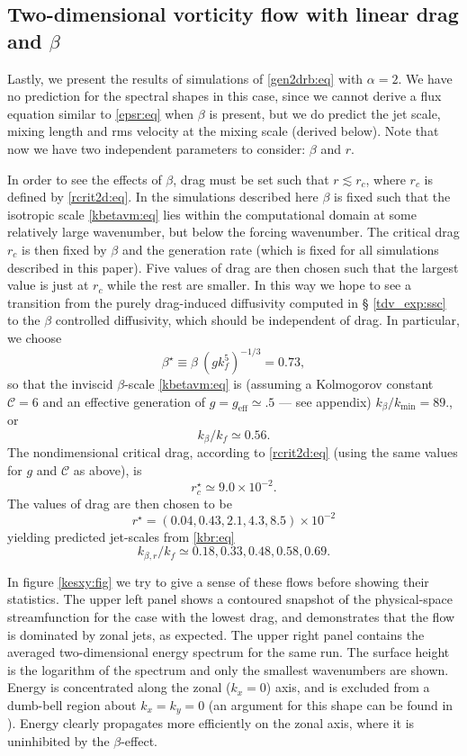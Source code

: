 \documentclass{jfm}
\newcommand{\ca}  [1]{\mathcal{#1}}
\begin{document}
\subsection{Two-dimensional vorticity flow with linear drag and $\beta$}
\label{tdvbr_exp:ssc}

Lastly, we present the results of simulations of \eqref{gen2drb:eq}
with $\alpha=2$.  We have no prediction for the spectral shapes in
this case, since we cannot derive a flux equation similar to
\eqref{epsr:eq} when $\beta$ is present, but we do predict the jet
scale, mixing length and rms velocity at the mixing scale (derived
below). Note that now we have two independent parameters to consider:
$\beta$ and $r$.

In order to see the effects of $\beta$, drag must be set such that
$r\lesssim r_c$, where $r_c$ is defined by \eqref{rcrit2d:eq}.  In the
simulations described here $\beta$ is fixed such that the isotropic
scale \eqref{kbetavm:eq} lies within the computational domain at some
relatively large wavenumber, but below the forcing wavenumber.  The
critical drag $r_c$ is then fixed by $\beta$ and the generation rate
(which is fixed for all simulations described in this paper).  Five
values of drag are then chosen such that the largest value is just at
$r_c$ while the rest are smaller.  In this way we hope to see a
transition from the purely drag-induced diffusivity computed in \S
\ref{tdv_exp:ssc} to the $\beta$ controlled diffusivity, which should
be independent of drag. In particular, we choose
\[
\beta^{\star} \equiv \beta~\left(gk_f^5\right)^{-1/3} = 0.73,  %
\]
so that the inviscid $\beta$-scale \eqref{kbetavm:eq} is
(assuming a Kolmogorov constant $\ca{C}=6$ and an effective
generation of $g=g_{\textrm{eff}}\simeq .5$ --- see appendix)
$k_{\beta}/k_{\mathrm{min}}=89.$, or
\[
k_{\beta}/k_f \simeq 0.56.   %
\]
The nondimensional critical drag, according to \eqref{rcrit2d:eq}
(using the same values for $g$ and $\ca{C}$ as above), is
\[
r_c^{\star} \simeq 9.0\times 10^{-2}.              %
\]
The values of drag are then chosen to be
\[
r^{\star} = (0.04, 0.43, 2.1, 4.3, 8.5)\times 10^{-2}
\]
yielding predicted jet-scales from \eqref{kbr:eq}
\[
k_{\beta,r}/k_f \simeq 0.18, 0.33, 0.48, 0.58, 0.69.
\]

In figure \ref{kesxy:fig} we try to give a sense of these flows
before showing their statistics.  The upper left panel shows a
contoured snapshot of the physical-space streamfunction for the
case with the lowest drag, and demonstrates that the flow is
dominated by zonal jets, as expected.  The upper right panel
contains the averaged two-dimensional energy spectrum for the
same run.  The surface height is the logarithm of the spectrum and
only the smallest wavenumbers are shown. Energy is concentrated
along the zonal ($k_x=0$) axis, and is excluded from a dumb-bell
region about $k_x=k_y=0$ (an argument for this shape can be found
in \citet{Vallis93a}).  Energy clearly propagates more efficiently
on the zonal axis, where it is uninhibited by the $\beta$-effect.
\end{document}
